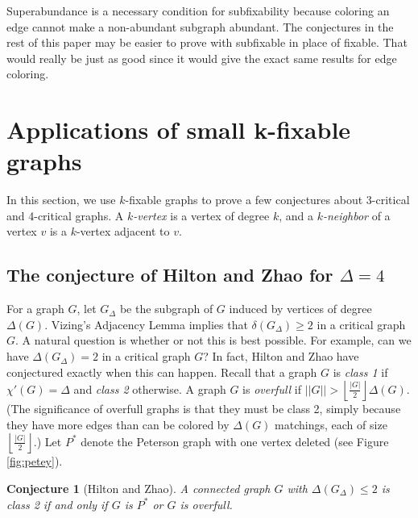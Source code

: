 \documentclass[12pt]{article}
\theoremstyle{plain}
\newtheorem{conjecture}[thm]{Conjecture}
\theoremstyle{definition}
\theoremstyle{remark}
\newcommand{\floor}[1]{\left\lfloor#1\right\rfloor}
\begin{document}
Superabundance is a necessary condition for subfixability because coloring an
edge cannot make a non-abundant subgraph abundant.  The conjectures in the rest
of this paper may be easier to prove with subfixable in place of fixable.  That would
really be just as good since it would give the exact same results for edge coloring.

\section{Applications of small k-fixable graphs}
In this section, we use $k$-fixable graphs to prove a few conjectures about
3-critical and 4-critical graphs.
A \emph{$k$-vertex} is a vertex of degree $k$, and a \emph{$k$-neighbor} of a
vertex $v$ is a $k$-vertex adjacent to $v$.

\subsection{The conjecture of Hilton and Zhao for $\Delta=4$}
For a graph $G$, let $G_\Delta$ be the subgraph of $G$ induced by vertices of
degree $\Delta(G)$.  Vizing's Adjacency Lemma implies that $\delta(G_\Delta) \ge
2$ in a critical graph $G$.  A natural question is whether or not this is 
best possible.  For example, can we have $\Delta(G_\Delta) = 2$ in a
critical graph $G$?  In fact, Hilton and Zhao have conjectured exactly when
this can happen.  
Recall that a graph $G$ is \emph{class 1} if $\chi'(G)=\Delta$ and \emph{class
2} otherwise.
A graph $G$ is \emph{overfull} if $||G|| >
\floor{\frac{|G|}{2}}\Delta(G)$.  (The significance of overfull graphs is that
they must be class 2, simply because they have more edges than can be colored by
$\Delta(G)$ matchings, each of size $\floor{\frac{|G|}2}$.)
Let $P^*$ denote the Peterson graph with one
vertex deleted (see Figure \ref{fig:petey}).

\begin{conjecture}[Hilton and Zhao]
A connected graph $G$ with $\Delta(G_\Delta) \le 2$ is class 2 if and only if
$G$ is $P^*$ or $G$ is overfull.
\end{conjecture}
\end{document}
